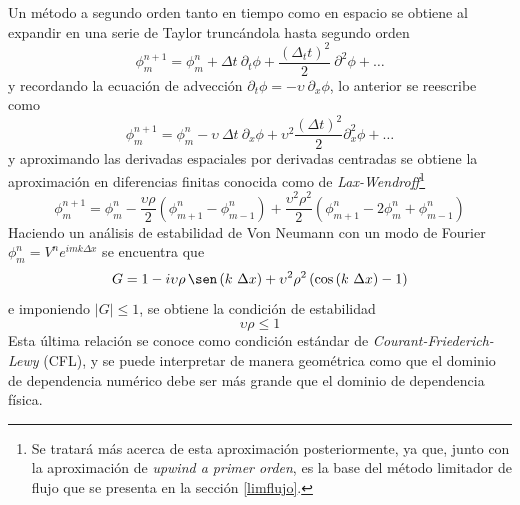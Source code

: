 \documentclass[11pt,twoside,openright,spanish]{report}
\numberwithin{equation}{chapter}
\numberwithin{figure}{chapter}
\numberwithin{table}{chapter}
\renewcommand{\sin}{\operatorname{\sen}}
\begin{document}
Un método a segundo orden tanto en tiempo como en espacio se obtiene al expandir en una serie de Taylor truncándola hasta segundo orden
\begin{equation}
\phi^{n+1}_m=\phi_m^n+\Delta t\ \partial_t \phi+\frac{\left(\Delta_t t\right)^2}{2}\ \partial^2\phi+\dots
\end{equation}
y recordando la ecuación de advección $\partial_t\phi=-\upsilon\ \partial_x\phi$, lo anterior se reescribe como
\begin{equation}
\phi^{n+1}_m=\phi^n_m-\upsilon\ \Delta t\ \partial_x \phi+\upsilon^2\frac{\left(\Delta t\right)^2}{2}\partial_x^2\phi+\dots
\end{equation}
y aproximando las derivadas espaciales por derivadas centradas se obtiene la aproximación en diferencias finitas conocida como de \textit{Lax-Wendroff}\footnote{Se tratará más acerca de esta aproximación posteriormente, ya que, junto con la aproximación de \textit{upwind a primer orden}, es la base del método limitador de flujo que se presenta en la sección \ref{limflujo}.}
\begin{equation}
\phi^{n+1}_m=\phi^n_m-\frac{\upsilon \rho}{2}\left(\phi_{m+1}^n-\phi_{m-1}^n\right)+\frac{\upsilon^2\rho^2}{2}\left(\phi^n_{m+1}-2\phi^n_m+\phi^n_{m-1}\right)
\end{equation}
Haciendo un análisis de estabilidad de Von Neumann con un modo de Fourier $\phi^n_m=V^ne^{imk\Delta x}$ se encuentra que
\begin{equation}
G=1-i\upsilon\rho\sin\left(k\ \Delta x\right)+\upsilon^2\rho^2\left(\cos\left(k\ \Delta x\right)-1\right)
\end{equation}
e imponiendo $\left|G\right|\leq 1$, se obtiene la condición de estabilidad
\begin{equation}
\upsilon\rho\leq 1
\end{equation}
Esta última relación se conoce como condición estándar de \textit{Courant-Friederich-Lewy} (CFL), y se puede interpretar de manera geométrica como que el dominio de dependencia numérico debe ser más grande que el dominio de dependencia física. 
\end{document}
